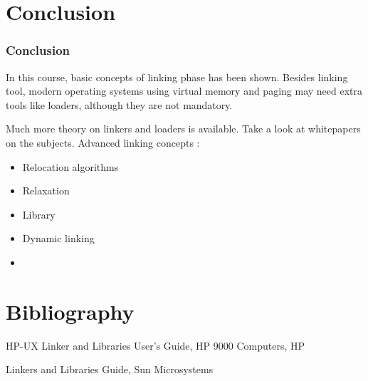 %
%

\section{Conclusion}


\begin{frame}
  \frametitle{Conclusion}

  In this course, basic concepts of linking phase has been shown. Besides
  linking tool, modern operating systems using virtual memory and paging
  may need extra tools like loaders, although they are not mandatory.

  \-

  Much more theory on linkers and loaders is available. Take a look
  at whitepapers on the subjects. Advanced linking concepts :

  \begin{itemize}
    \item
        Relocation algorithms
    \item
        Relaxation
    \item
        Library
    \item
        Dynamic linking
    \item
      \etc{}
  \end{itemize}

\end{frame}



%
%

\section{Bibliography}

\begin{thebibliography}{3}
    HP-UX Linker and Libraries User's Guide, HP 9000 Computers, HP

    Linkers and Libraries Guide, Sun Microsystems
\end{thebibliography}


